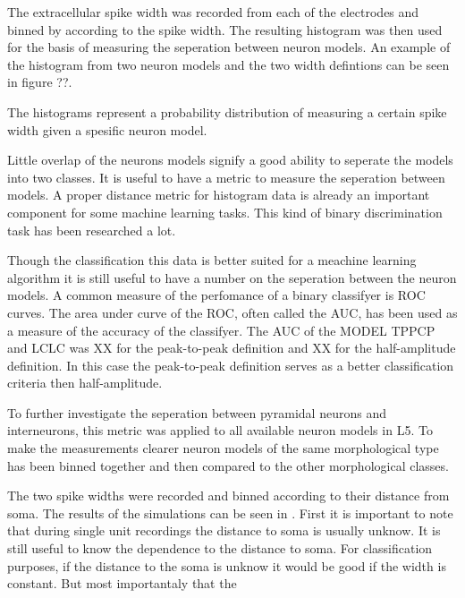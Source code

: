 \documentclass[altfont, fleqn]{uiophd}
\renewcommand{\cref}[1]{{\color{viridis_03}\mycref{#1}}}
\begin{document}
The extracellular spike width was recorded from each of the
electrodes and binned by according to the spike width.
The resulting histogram was then used for the basis
of measuring the seperation between neuron models.
An example of the histogram from two neuron models and 
the two width defintions can be seen in figure ??. 

The histograms represent a probability distribution of
measuring a certain spike width given a spesific neuron
model. 

Little overlap of the neurons models signify
a good ability to seperate the models into two classes. 
It is useful to have a metric to measure the seperation 
between models.
A proper distance metric for histogram data is already 
an important component for some machine learning tasks. 
This kind of binary discrimination task has been researched
a lot.

Though the classification this data is better suited for a
meachine learning algorithm 
it is still useful to have a number on the seperation 
between the neuron models. 
A common measure of the perfomance of a binary classifyer
is ROC curves. 
The area under curve of the ROC, often called the AUC, 
has been used as a measure 
of the accuracy of the classifyer. 
The AUC of the MODEL TPPCP and LCLC was XX for
the peak-to-peak definition and XX for the half-amplitude 
definition. 
In this case the peak-to-peak definition serves as a better
classification criteria then half-amplitude.

To further investigate the seperation between pyramidal
neurons and interneurons, this metric was applied to 
all available neuron models in L5. 
To make the measurements clearer neuron models
of the same morphological type has been binned together
and then compared to the other morphological classes. 




The two spike widths were recorded and binned according 
to their distance from soma. 
The results of the simulations can be seen in 
\cref{fig:4_2_width}.
First it is important to note that during single unit 
recordings
the distance to soma is usually unknow. 
It is still useful to know the dependence to 
the distance to soma. 
For classification purposes, if the distance to
the soma is unknow it would be good if the width 
is constant.
But most importantaly that the 
\end{document}
